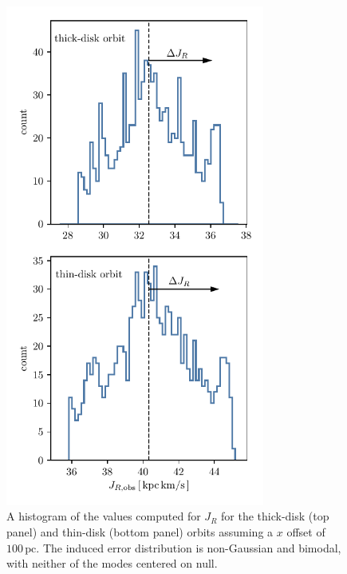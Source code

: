 \documentclass[twocolumn]{aastex62}
\newcommand{\pc}{\text{pc}}
\begin{document}
\begin{figure}
\begin{center}
\includegraphics[width=3.35224200913in]{fig/schmactions_JR_xerr_hist.pdf}
\end{center}
\caption{A histogram of the values computed for $J_R$ for the thick-disk (top
panel) and thin-disk (bottom panel) orbits assuming a $x$ offset of
$100\,\pc$. The induced error distribution is non-Gaussian and bimodal, with
neither of the modes centered on null.}
\label{fig:JR_xerr_hist}
\end{figure}
\end{document}
